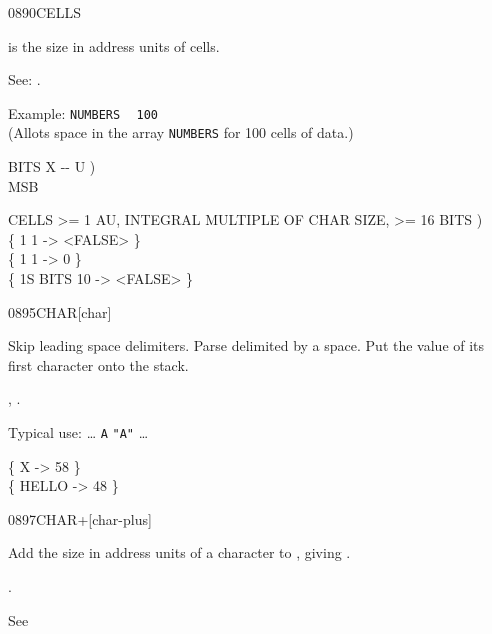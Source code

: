 \begin{worddef}{0890}{CELLS}
\item {}

	 is the size in address units of  cells.

	\begin{defer}
	\rationale %
		See: .

		Example:
			 \texttt{NUMBERS} ~
			\texttt{100}   \\
		(Allots space in the array \texttt{NUMBERS} for 100 cells
		of data.)

	\testing
		\word{:} BITS  X -{}- U ) \\
		      MSB 
			       
		\word{;}

		 CELLS >= 1 AU, INTEGRAL MULTIPLE OF CHAR SIZE, >= 16 BITS ) \\
		\{ 1  1  -> <FALSE> \} \\
		\{ 1  1   -> 0 \} \\
		\{ 1S BITS 10  -> <FALSE> \}
	\end{defer}
\end{worddef}


\begin{worddef}{0895}{CHAR}[char]
\item {}

	Skip leading space delimiters. Parse  delimited by
	a space. Put the value of its first character onto the stack.

\see {},
	\wref{core:[CHAR]}{[CHAR]}.

	\begin{defer}
	\rationale %
		Typical use: {\ldots}
			 \texttt{A}  \texttt{"A"} {\ldots}

	\testing
		\{  X     -> 58 \} \\
		\{  HELLO -> 48 \}
	\end{defer}
\end{worddef}


\begin{worddef}{0897}{CHAR+}[char-plus]
\item {}

	Add the size in address units of a character to
	, giving \param{c-addr_2}.

\see {}.

	\begin{defer}
	\testing*
		See \rref{core:C,}{C,}
	\end{defer}
\end{worddef}


